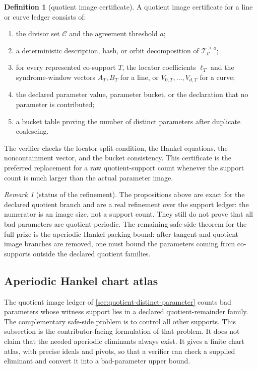 \documentclass[11pt]{article}
\theoremstyle{definition}
\newtheorem{definition}[theorem]{Definition}
\theoremstyle{remark}
\newtheorem{remark}[theorem]{Remark}
\begin{document}
\begin{definition}[quotient image certificate]
\label{def:quotient-image-certificate}
A quotient image certificate for a line or curve ledger consists of:
\begin{enumerate}[label=\textup{(\roman*)}]
\item the divisor set $\mathcal C$ and the agreement threshold $a$;
\item a deterministic description, hash, or orbit decomposition of
$\mathcal T_{\mathcal C}^{\ge a}$;
\item for every represented co-support $T$, the locator coefficients
$\boldsymbol\ell_T$ and the syndrome-window vectors $A_T,B_T$ for a line, or
$V_{0,T},\ldots,V_{d,T}$ for a curve;
\item the declared parameter value, parameter bucket, or the declaration that no
parameter is contributed;
\item a bucket table proving the number of distinct parameters after duplicate
coalescing.
\end{enumerate}
The verifier checks the locator split condition, the Hankel equations, the
noncontainment vector, and the bucket consistency.  This certificate is the
preferred replacement for a raw quotient-support count whenever the support count
is much larger than the actual parameter image.
\end{definition}

\begin{remark}[status of the refinement]
\label{rem:distinct-ledger-status}
The propositions above are exact for the declared quotient branch and are a real
refinement over the support ledger: the numerator is an image size, not a support
count.  They still do not prove that all bad parameters are quotient-periodic.
The remaining safe-side theorem for the full prize is the aperiodic Hankel-packing
bound: after tangent and quotient image branches are removed, one must bound the
parameters coming from co-supports outside the declared quotient families.
\end{remark}


\subsection{Aperiodic Hankel chart atlas}
\label{sec:aperiodic-hankel-certificates}

The quotient image ledger of \cref{sec:quotient-distinct-parameter} counts bad
parameters whose witness support lies in a declared quotient-remainder family.
The complementary safe-side problem is to control all other supports.  This
subsection is the contributor-facing formulation of that problem.  It does not claim
that the needed aperiodic eliminants always exist.  It gives a finite chart
atlas, with precise ideals and pivots, so that a verifier can check a supplied
eliminant and convert it into a bad-parameter upper bound.
\end{document}
